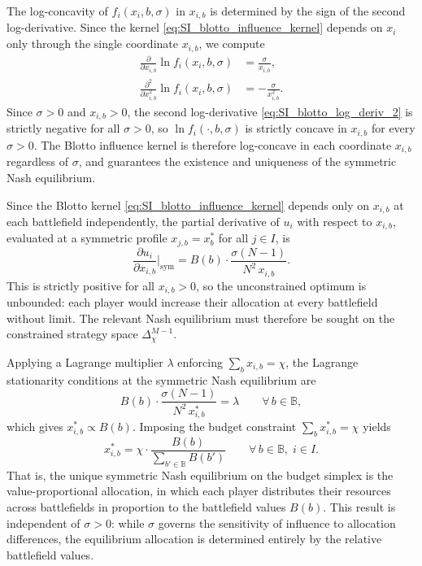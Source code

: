 \documentclass{article}
\begin{document}
        The log-concavity of $f_i(x_i, b, \sigma)$ in $x_{i,b}$ is determined by the sign of the second log-derivative.
        Since the kernel \cref{eq:SI_blotto_influence_kernel} depends on $x_i$ only through the single coordinate $x_{i,b}$, we compute
        \begin{align}
            \frac{\partial}{\partial x_{i,b}} \ln f_i(x_i, b, \sigma)
            &= \frac{\sigma}{x_{i,b}},
            \label{eq:SI_blotto_log_deriv_1} \\
            \frac{\partial^2}{\partial x_{i,b}^2} \ln f_i(x_i, b, \sigma)
            &= -\frac{\sigma}{x_{i,b}^2}.
            \label{eq:SI_blotto_log_deriv_2}
        \end{align}
        Since $\sigma > 0$ and $x_{i,b} > 0$, the second log-derivative \cref{eq:SI_blotto_log_deriv_2} is strictly negative for all $\sigma > 0$, so $\ln f_i(\cdot, b, \sigma)$ is strictly concave in $x_{i,b}$ for every $\sigma > 0$.
        The Blotto influence kernel is therefore log-concave in each coordinate $x_{i,b}$ regardless of $\sigma$, and  guarantees the existence and uniqueness of the symmetric Nash equilibrium.

        Since the Blotto kernel \cref{eq:SI_blotto_influence_kernel} depends only on $x_{i,b}$ at each battlefield independently, the partial derivative of $u_i$ with respect to $x_{i,b}$, evaluated at a symmetric profile $x_{j,b} = x_b^*$ for all $j \in I$, is
        \begin{equation}
            \frac{\partial u_i}{\partial x_{i,b}}\bigg|_{\mathrm{sym}}
            = B(b)\cdot\frac{\sigma(N-1)}{N^2\,x_{i,b}}.
        \end{equation}
        This is strictly positive for all $x_{i,b} > 0$, so the unconstrained optimum is unbounded: each player would increase their allocation at every battlefield without limit.
        The relevant Nash equilibrium must therefore be sought on the constrained strategy space $\Delta_\chi^{M-1}$.

        Applying a Lagrange multiplier $\lambda$ enforcing $\sum_b x_{i,b} = \chi$, the Lagrange stationarity conditions \cite{boyd2004convex} at the symmetric Nash equilibrium are
        \begin{equation}
            B(b)\cdot\frac{\sigma(N-1)}{N^2\,x_{i,b}^*} = \lambda
            \qquad \forall\, b \in \mathbb{B},
        \end{equation}
        which gives $x_{i,b}^* \propto B(b)$.
        Imposing the budget constraint $\sum_{b} x_{i,b}^* = \chi$ yields
        \begin{equation}
            x_{i,b}^* = \chi\cdot\frac{B(b)}{\sum_{b'\in\mathbb{B}}B(b')}
            \qquad \forall\, b \in \mathbb{B},\; i \in I.
        \end{equation}
        That is, the unique symmetric Nash equilibrium on the budget simplex is the value-proportional allocation, in which each player distributes their resources across battlefields in proportion to the battlefield values $B(b)$.
        This result is independent of $\sigma > 0$: while $\sigma$ governs the sensitivity of influence to allocation differences, the equilibrium allocation is determined entirely by the relative battlefield values.
\end{document}
